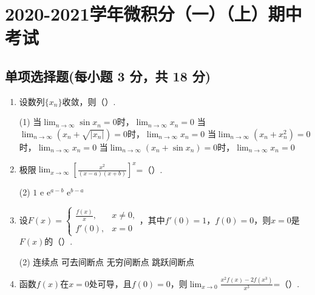 \documentclass[../main.tex]{subfiles}
\begin{document}
\chapter{2020-2021学年微积分（一）（上）期中考试}

\section{单项选择题(每小题 3 分，共 18 分)}
\begin{enumerate}
    \item 设数列$\{x_{n}\}$收敛，则（\qquad）.

          \begin{tasks}[label=\textbf{\Alph*.}, label-width=1.5em, column-sep=1em](1)
              \task 当$\lim_{n\to\infty}\sin x_{n}=0$时，$\lim_{n\to\infty}x_{n}=0$
              \task 当$\lim_{n\to\infty}\left(x_{n}+\sqrt{|x_{n}|}\right)=0$时，$\lim_{n\to\infty}x_{n}=0$
              \task 当$\lim_{n\to\infty}\left(x_{n}+x_{n}^{2}\right)=0$时，$\lim_{n\to\infty}x_{n}=0$
              \task 当$\lim_{n\to\infty}\left(x_{n}+\sin x_{n}\right)=0$时，$\lim_{n\to\infty}x_{n}=0$
          \end{tasks}

    \item 极限$\lim_{x\to\infty}\left[\frac{x^{2}}{(x-a)(x+b)}\right]^{x}$=（\qquad）.

          \begin{tasks}[label=\textbf{\Alph*.}, label-width=1.5em, column-sep=1em](2)
              \task $1$
              \task $\mathrm{e}$
              \task $\mathrm{e}^{a-b}$
              \task $\mathrm{e}^{b-a}$
          \end{tasks}

    \item 设$F(x)=
              \begin{cases}
                  \frac{f(x)}{x}, & x\neq0, \\
                  f'(0),          & x=0
              \end{cases}$，其中$f'(0)=1$，$f(0)=0$，则$x=0$是$F(x)$的（\qquad）.

          \begin{tasks}[label=\textbf{\Alph*.}, label-width=1.5em, column-sep=1em](2)
              \task 连续点
              \task 可去间断点
              \task 无穷间断点
              \task 跳跃间断点
          \end{tasks}

    \item 函数$f(x)$在$x=0$处可导，且$f(0)=0$，则$\lim_{x\to0}\frac{x^{2}f(x)-2f(x^{3})}{x^{3}}$=（\qquad）.


\end{enumerate}
\end{document}

